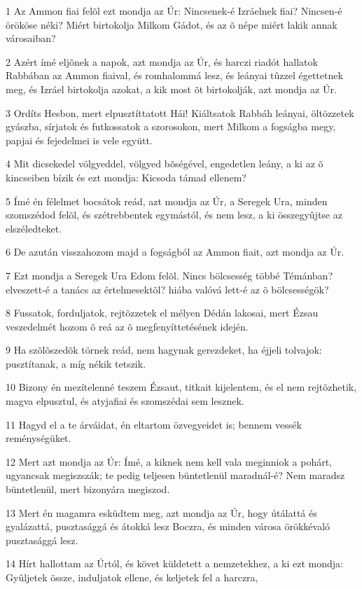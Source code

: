 \par 1 Az Ammon fiai felõl ezt mondja az Úr: Nincsenek-é Izráelnek fiai? Nincsen-é örököse néki? Miért birtokolja Milkom Gádot, és az õ népe miért lakik annak városaiban?
\par 2 Azért ímé eljõnek a napok, azt mondja az Úr, és harczi riadót hallatok Rabbában az Ammon fiaival, és romhalommá lesz, és leányai tûzzel égettetnek meg, és Izráel birtokolja azokat, a kik most õt birtokolják, azt mondja az Úr.
\par 3 Ordíts Hesbon, mert elpusztíttatott Hái! Kiáltsatok Rabbáh leányai, öltözzetek gyászba, sírjatok és futkossatok a szorosokon, mert Milkom a fogságba megy, papjai és fejedelmei is vele együtt.
\par 4 Mit dicsekedel völgyeddel, völgyed bõségével, engedetlen leány, a ki az õ kincseiben bízik és ezt mondja: Kicsoda támad ellenem?
\par 5 Ímé én félelmet bocsátok reád, azt mondja az Úr, a Seregek Ura, minden szomszédod felõl, és szétrebbentek egymástól, és nem lesz, a ki összegyûjtse az elszéledteket.
\par 6 De azután visszahozom majd a fogságból az Ammon fiait, azt mondja az Úr.
\par 7 Ezt mondja a Seregek Ura Edom felõl. Nincs bölcsesség többé Témánban? elveszett-é a tanács az értelmesektõl? hiába valóvá lett-é az õ bölcsességök?
\par 8 Fussatok, forduljatok, rejtõzzetek el mélyen Dédán lakosai, mert Ézsau veszedelmét hozom õ reá az õ megfenyíttetésének idején.
\par 9 Ha szõlõszedõk törnek reád, nem hagynak gerezdeket, ha éjjeli tolvajok: pusztítanak, a míg nékik tetszik.
\par 10 Bizony én mezítelenné teszem Ézsaut, titkait kijelentem, és el nem rejtõzhetik, magva elpusztul, és atyjafiai és szomszédai sem lesznek.
\par 11 Hagyd el a te árváidat, én eltartom özvegyeidet is; bennem vessék reménységüket.
\par 12 Mert azt mondja az Úr: Ímé, a kiknek nem kell vala meginniok a pohárt, ugyancsak megiszszák; te pedig teljesen büntetlenül maradnál-é? Nem maradsz büntetlenül, mert bizonyára megiszod.
\par 13 Mert én magamra esküdtem meg, azt mondja az Úr, hogy útálattá és gyalázattá, pusztasággá és  átokká lesz Boczra, és minden városa örökkévaló pusztasággá lesz.
\par 14 Hírt hallottam az Úrtól, és követ küldetett a nemzetekhez, a ki ezt mondja: Gyûljetek össze, induljatok ellene, és keljetek fel a harczra,
